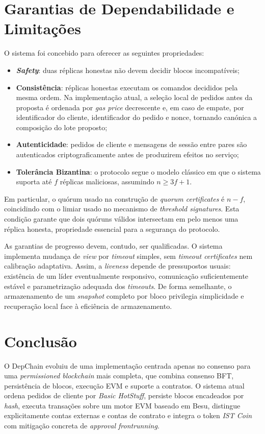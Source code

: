 \documentclass[runningheads]{llncs}
\begin{document}
\section{Garantias de Dependabilidade e Limita\c{c}\~oes}
O sistema foi concebido para oferecer as seguintes propriedades:
\begin{itemize}
\item \textbf{\textit{Safety}}: duas r\'eplicas honestas n\~ao devem decidir blocos incompat\'iveis;
\item \textbf{Consist\^encia}: r\'eplicas honestas executam os comandos decididos pela mesma ordem. Na implementa\c{c}\~ao atual, a sele\c{c}\~ao local de pedidos antes da proposta \'e ordenada por \textit{gas price} decrescente e, em caso de empate, por identificador do cliente, identificador do pedido e nonce, tornando can\'onica a composi\c{c}\~ao do lote proposto;
\item \textbf{Autenticidade}: pedidos de cliente e mensagens de sess\~ao entre pares s\~ao autenticados criptograficamente antes de produzirem efeitos no servi\c{c}o;
\item \textbf{Toler\^ancia Bizantina}: o protocolo segue o modelo cl\'assico em que o sistema suporta at\'e \(f\) r\'eplicas maliciosas, assumindo \(n \ge 3f + 1\).
\end{itemize}

Em particular, o qu\'orum usado na constru\c{c}\~ao de \textit{quorum certificates} \'e \(n-f\), coincidindo com o limiar usado no mecanismo de \textit{threshold signatures}. Esta condi\c{c}\~ao garante que dois qu\'oruns v\'alidos intersectam em pelo menos uma r\'eplica honesta, propriedade essencial para a seguran\c{c}a do protocolo.

As garantias de progresso devem, contudo, ser qualificadas. O sistema implementa mudan\c{c}a de \textit{view} por \textit{timeout} simples, sem \textit{timeout certificates} nem calibra\c{c}\~ao adaptativa. Assim, a \textit{liveness} depende de pressupostos usuais: exist\^encia de um l\'ider eventualmente responsivo, comunica\c{c}\~ao suficientemente est\'avel e parametriza\c{c}\~ao adequada dos \textit{timeouts}. De forma semelhante, o armazenamento de um \textit{snapshot} completo por bloco privilegia simplicidade e recupera\c{c}\~ao local face \`a efici\^encia de armazenamento.

\section{Conclus\~ao}
O DepChain evoluiu de uma implementa\c{c}\~ao centrada apenas no consenso para uma \textit{permissioned blockchain} mais completa, que combina consenso BFT, persist\^encia de blocos, execu\c{c}\~ao EVM e suporte a contratos. O sistema atual ordena pedidos de cliente por \textit{Basic HotStuff}, persiste blocos encadeados por \textit{hash}, executa transa\c{c}\~oes sobre um motor EVM baseado em Besu, distingue explicitamente contas externas e contas de contrato e integra o token \textit{IST Coin} com mitiga\c{c}\~ao concreta de \textit{approval frontrunning}.
\end{document}

